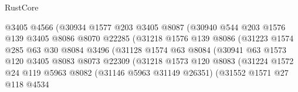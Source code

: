 \begin{lexlean}{RustCore}
\begin{coremodule}
                                @3405
                                @4566
                                (@30934
                                  @1577
                                  @203
                                  @3405
                                  @8087
                                  (@30940
                                    @544
                                    @203
                                    @1576
                                    @139
                                    @3405
                                    @8086
                                    @8070
                                    @22285
                                    (@31218
                                      @1576
                                      @139
                                      @8086
                                      (@31223
                                        @1574
                                        @285
                                        @63
                                        @30
                                        @8084
                                        @3496
                                        (@31128
                                          @1574
                                          @63
                                          @8084
                                          (@30941
                                            @63
                                            @1573
                                            @120
                                            @3405
                                            @8083
                                            @8073
                                            @22309
                                            (@31218
                                              @1573
                                              @120
                                              @8083
                                              (@31224
                                                @1572
                                                @24
                                                @119
                                                @5963
                                                @8082
                                                (@31146 @5963 @31149 @26351)
                                                (@31552
                                                  @1571
                                                  @27
                                                  @118
                                                  @4534

\end{coremodule}
\end{lexlean}
